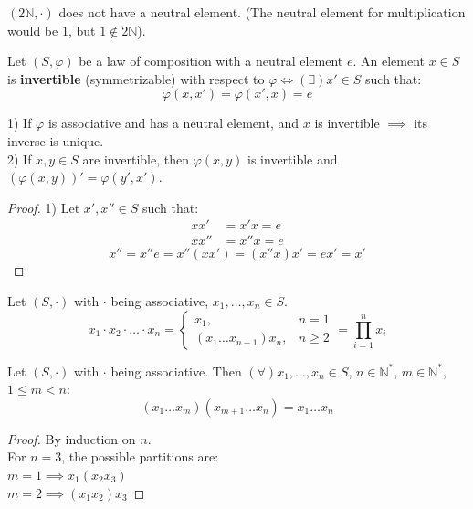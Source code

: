 \begin{example}
$(2\mathbb{N}, \cdot)$ does not have a neutral element. (The neutral element for multiplication would be $1$, but $1 \notin 2\mathbb{N}$).
\end{example}

\begin{definition}
Let $(S, \varphi)$ be a law of composition with a neutral element $e$. An element $x \in S$ is \textbf{invertible} (symmetrizable) with respect to $\varphi \iff (\exists) x' \in S$ such that:
$$ \varphi(x, x') = \varphi(x', x) = e $$
\end{definition}

\begin{proposition}
1) If $\varphi$ is associative and has a neutral element, and $x$ is invertible $\implies$ its inverse is unique. \\
2) If $x, y \in S$ are invertible, then $\varphi(x, y)$ is invertible and $(\varphi(x, y))' = \varphi(y', x')$.
\end{proposition}

\begin{proof}
1) Let $x', x'' \in S$ such that:
\begin{align*}
    x x' &= x' x = e \\
    x x'' &= x'' x = e
\end{align*}
$$ x'' = x'' e = x'' (x x') = (x'' x) x' = e x' = x' $$
\end{proof}


\begin{definition}
Let $(S, \cdot)$ with $\cdot$ being associative, $x_1, \dots, x_n \in S$.
$$ x_1 \cdot x_2 \cdot \dots \cdot x_n = \begin{cases} x_1, & n=1 \\ (x_1 \dots x_{n-1})x_n, & n \ge 2 \end{cases} = \prod_{i=1}^n x_i $$
\end{definition}

\begin{lemma}
Let $(S, \cdot)$ with $\cdot$ being associative. Then $(\forall) x_1, \dots, x_n \in S$, $n \in \mathbb{N}^*$, $m \in \mathbb{N}^*$, $1 \le m < n$:
$$ (x_1 \dots x_m)(x_{m+1} \dots x_n) = x_1 \dots x_n $$
\end{lemma}

\begin{proof}
By induction on $n$. \\
For $n=3$, the possible partitions are: \\
$m=1 \implies x_1(x_2 x_3)$ \\
$m=2 \implies (x_1 x_2)x_3$
\end{proof}


